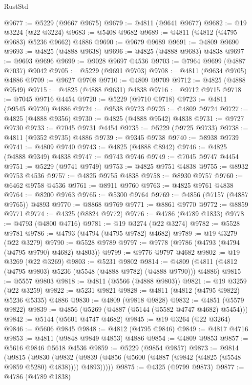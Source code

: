 \begin{lexlean}{RustStd}
\begin{coremodule}
{\begin{coremodule}
{{{{{{{{{{{{{{{{{{{{{{{{{{{{{{{{{{{{{{{{{{{{{{{{{{{{{{{{{{{{{{{{{{{{{{{{{{{{{{{{@9677 := @5229 (@9667 @9675)
@9679 := @4811 (@9641 @9677)
@9682 := @19 @3224 (@22 @3224)
@9683 := @5408 @9682
@9689 := @4811 (@4812 (@4795 @9683) @5236 @9662) @4886
@9690 := @9679 @9689
@9691 := @4809 @9690
@9693 := @4825 (@4888 @9638)
@9696 := @4825 (@4888 @9683) @4838
@9697 := @9693 @9696
@9699 := @9028 @9697 @4536
@9703 := @7964 @9699 (@4887 @7037) @9042
@9705 := @5229 (@9691 @9703)
@9708 := @4811 (@9634 @9705) @4886
@9709 := @9627 @9708
@9710 := @4809 @9709
@9712 := @4825 (@4888 @9549)
@9715 := @4825 (@4888 @9631) @4838
@9716 := @9712 @9715
@9718 := @7045 @9716 @4454
@9720 := @5229 (@9710 @9718)
@9723 := @4811 (@9545 @9720) @4886
@9724 := @9538 @9723
@9725 := @4809 @9724
@9727 := @4825 (@4888 @9356)
@9730 := @4825 (@4888 @9542) @4838
@9731 := @9727 @9730
@9733 := @7045 @9731 @4454
@9735 := @5229 (@9725 @9733)
@9738 := @4811 (@9352 @9735) @4886
@9739 := @9345 @9738
@9740 := @8938 @9739
@9741 := @4809 @9740
@9743 := @4825 (@4888 @8942)
@9746 := @4825 (@4888 @9349) @4838
@9747 := @9743 @9746
@9749 := @7045 @9747 @4454
@9751 := @5229 (@9741 @9749)
@9753 := @4825 @9751 @4838
@9755 := @8932 @9753 @4536
@9757 := @4825 @9755 @4838
@9758 := @8930 @9757
@9760 := @6462 @9758 @4536
@9761 := @8911 @9760
@9763 := @4825 @9761 @4838
@9764 := @8200 @9763
@9765 := @5300 @9764
@9769 := @4856 (@7157 (@4887 @9765)) @4893
@9770 := @8868 @9769
@9771 := @8861 @9770
@9772 := @8859 @9771
@9774 := @4325 (@8824 @9772)
@9776 := @4786 (@4789 @1833)
@9778 := @4793 (@4800 @4716)
@9781 := @19 @3274 (@22 @3274)
@9782 := @5528 @9781
@9786 := @4793 (@4794 (@4795 @9782) @4682)
@9789 := @19 @3279 (@22 @3279)
@9790 := @5528 @9789
@9797 := @9778 (@9786 (@4793 (@4794 (@4795 @9790) @4682) @4803))
@9799 := @9776 @9797 @4682
@9802 := @19 @3269 (@22 @3269)
@9803 := @5231 @9802
@9814 := @4809 (@4811 (@4812 (@4795 @9803) @5236 (@5548 (@4888 @9782) (@4888 @9790))) @4886)
@9815 := @5557 @9803
@9818 := @4811 (@5566 (@4888 @9803))
@9821 := @19 @3259 (@22 @3259)
@9822 := @5231 @9821
@9828 := @4811 (@4812 (@4795 @9822) @5236 @5335) @4886
@9830 := @4809 (@9818 @9828)
@9832 := @4851 (@5579 @9822)
@9839 := @4856 (@5269 (@4887 (@5144 (@5582 @4747 @4682) @5454)))
@9842 := @5144 (@5601 @4747 @4682)
@9845 := @19 @3264 (@22 @3264)
@9846 := @5606 @9845
@9848 := @4812 (@4795 @9846)
@9849 := @4817 @4716
@9853 := @4811 (@9848 @9849 @4853) @4886
@9854 := @4809 @9853
@9857 := @5616 @9846 @5618 @4536
@9859 := @5229 (@9854 @9857)
@9873 := @9814
    (@9815
      (@9830
        (@9832 (@9839 (@4856 (@5600 (@4887 (@9842 (@4825 (@5548 @9859 @5280) @4838)))) @4893)))))
@9875 := @4325 (@9799 @9873)
@9877 := @4786 (@4789 @1838)
}}}}}}}}}}}}}}}}}}}}}}}}}}}}}}}}}}}}}}}}}}}}}}}}}}}}}}}}}}}}}}}}}}}}}}}}}}}}}}}}
\end{coremodule}}
\end{coremodule}
\end{lexlean}
